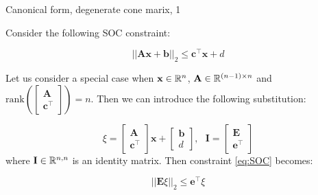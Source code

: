 \documentclass{beamer}
\begin{document}
\begin{frame}{Canonical form, degenerate cone marix, 1}
	\begin{flushleft}
		
		Consider the following SOC constraint:
		
		\begin{equation}
			\label{eq:SOC}
			||\mathbf{A}\mathbf{x} + \mathbf{b}||_2 \leq 
			\mathbf{c}^\top \mathbf{x} + d
		\end{equation}
		
		Let us consider a special case when $\mathbf{x} \in \mathbb{R}^n$, $\mathbf{A} \in \mathbb{R}^{(n-1) \times n}$ and $\text{rank}\left(\begin{bmatrix}
			\mathbf{A} \\ \mathbf{c}^\top
		\end{bmatrix}\right) = n$. Then we can introduce the following substitution:
		
		\begin{equation}
			\xi = \begin{bmatrix}
				\mathbf{A} \\ \mathbf{c}^\top
			\end{bmatrix}
			\mathbf{x} + 
			\begin{bmatrix}
				\mathbf{b} \\ d
			\end{bmatrix}, 
			\ \ \ 
			\mathbf{I} = 
			\begin{bmatrix}
				\mathbf{E} \\ \mathbf{e}^\top
			\end{bmatrix}
		\end{equation}
		where $\mathbf{I} \in\mathbb{R}^{n, n}$ is an identity matrix. Then constraint \eqref{eq:SOC} becomes:
		
		\begin{equation}
			||\mathbf{E}\xi||_2 \leq 
			\mathbf{e}^\top \xi
		\end{equation}
		
	\end{flushleft}
\end{frame}
\end{document}
